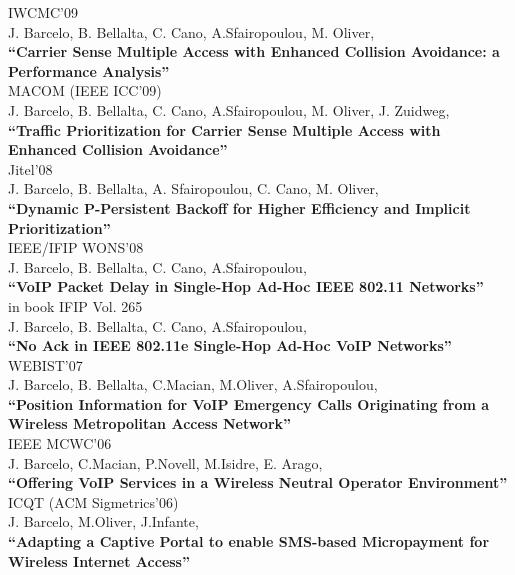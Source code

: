\documentclass[line,margin]{res}
\begin{document}
\begin{resume}
\hfill {IWCMC'09} \\
J. Barcelo, B. Bellalta,  C. Cano, A.Sfairopoulou, M. Oliver,\\
\textbf{``Carrier Sense Multiple Access with Enhanced Collision Avoidance: a Performance Analysis''}\\

\hfill {MACOM (IEEE ICC'09)} \\
J. Barcelo, B. Bellalta,  C. Cano, A.Sfairopoulou, M. Oliver, J. Zuidweg,\\
\textbf{``Traffic Prioritization for Carrier Sense Multiple Access with Enhanced Collision Avoidance''}\\

\newpage
\hfill {Jitel'08} \\
J. Barcelo, B. Bellalta, A. Sfairopoulou, C. Cano, M. Oliver,\\
\textbf{``Dynamic P-Persistent Backoff for Higher Efficiency and Implicit Prioritization''}\\

\hfill {IEEE/IFIP WONS'08} \\
J. Barcelo, B. Bellalta,  C. Cano, A.Sfairopoulou,\\
\textbf{``VoIP Packet Delay in Single-Hop Ad-Hoc IEEE 802.11 Networks''}\\

\hfill {in book IFIP Vol. 265} \\
J. Barcelo, B. Bellalta,  C. Cano, A.Sfairopoulou,\\
\textbf{``No Ack in IEEE 802.11e Single-Hop Ad-Hoc VoIP Networks''}\\

\hfill {WEBIST'07} \\
J. Barcelo, B. Bellalta, C.Macian, M.Oliver, A.Sfairopoulou,\\
\textbf{``Position Information for VoIP Emergency Calls Originating from a Wireless Metropolitan Access Network''}\\

\hfill {IEEE MCWC'06} \\
J. Barcelo, C.Macian, P.Novell, M.Isidre, E. Arago,\\
\textbf{``Offering VoIP Services in a Wireless Neutral Operator Environment''}\\

\hfill {ICQT (ACM Sigmetrics'06)} \\
J. Barcelo, M.Oliver, J.Infante,\\
\textbf{``Adapting a Captive Portal to enable SMS-based Micropayment for Wireless Internet Access''}\\


\end{resume}
\end{document}
